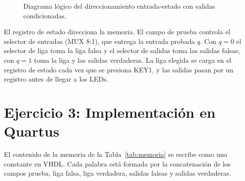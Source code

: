 \documentclass[11pt,letterpaper]{article}
\begin{document}
\begin{figure}[H]
\caption{Diagrama lógico del direccionamiento entrada-estado con salidas condicionadas.}
\label{fig:logico}
\end{figure}

El registro de estado direcciona la memoria. El campo de prueba controla el selector de entradas (MUX 8:1), que entrega la entrada probada $q$. Con $q=0$ el selector de liga toma la liga falsa y el selector de salidas toma las salidas falsas; con $q=1$ toma la liga y las salidas verdaderas. La liga elegida se carga en el registro de estado cada vez que se presiona KEY1, y las salidas pasan por un registro antes de llegar a los LEDs.

\section{Ejercicio 3: Implementación en Quartus}

El contenido de la memoria de la Tabla~\ref{tab:memoria} se escribe como una constante en VHDL. Cada palabra está formada por la concatenación de los campos prueba, liga falsa, liga verdadera, salidas falsas y salidas verdaderas.
\end{document}
